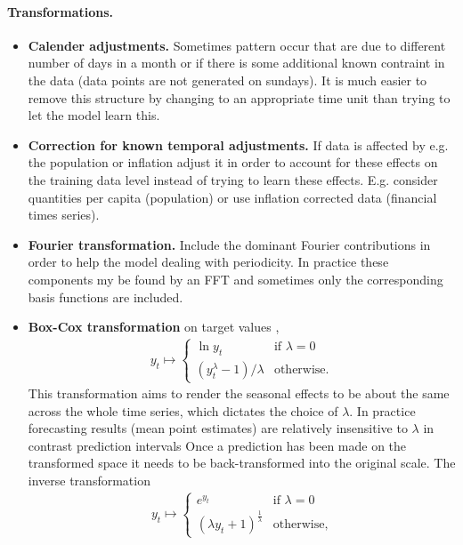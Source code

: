 \documentclass[12pt,a4paper]{article}
\begin{document}
\paragraph{Transformations.}
\begin{itemize}
	\item \textbf{Calender adjustments.} Sometimes pattern occur that are due to different number of days in a month or if there is some additional known contraint in the data  (data points are not generated on sundays). It is much easier to remove this structure by changing to an appropriate time unit than trying to let the model learn this.
	\item \textbf{Correction for known temporal adjustments.} If data is affected by e.g. the population or inflation adjust it in order to account for these effects on the training data level instead of trying to learn these effects. E.g. consider quantities per capita (population) or use inflation corrected data (financial times series).
	\item \textbf{Fourier transformation.} Include the dominant Fourier contributions in order to help the model dealing with periodicity. In practice these components my be found by an FFT and sometimes only the corresponding basis functions are included.
	\item \textbf{Box-Cox transformation} on target values \cite{hyndman_forecasting_principles_2018}, 
	\begin{align}
	y_t \mapsto 
	\begin{cases}
	 \ln y_t & \text{if } \lambda = 0\\ 
	 (y_t^\lambda - 1) /  \lambda & \text{otherwise.}
	\end{cases}	
	\end{align}
	This transformation aims to render the seasonal effects to be about the same across the whole time series, which dictates the choice of $\lambda$. In practice forecasting results (mean point estimates) are relatively insensitive to $\lambda$ in contrast prediction intervals Once a prediction has been made on the transformed space it needs to be back-transformed into the original scale. The inverse transformation
	\begin{align} \label{eq:inv_box_cox}
	y_t \mapsto 
	\begin{cases}
	e^{y_t} & \text{if } \lambda = 0\\ 
	(\lambda y_t + 1)^ \frac{1}{\lambda} & \text{otherwise,}
	\end{cases}	
	\end{align}

\end{itemize}
\end{document}
